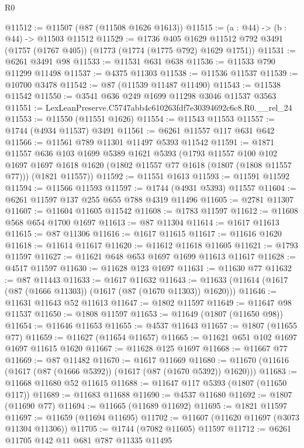 \begin{lexlean}{R0}
\begin{coremodule}
@11512 := @11507 (@87 (@11508 @1626 @1613))
@11515 := (a : @44) -> (b : @44) -> @11503 @11512
@11529 := @1736
    @405
    @1629
    @11512
    @792
    @3491
    (@1757 (@1767 @405))
    (@1773 (@1774 (@1775 @792) @1629 @1751))
@11531 := @6261 @3491 @98
@11533 := @11531 @631 @638
@11536 := @11533 @790 @11299 @11498
@11537 := @4375 @11303
@11538 := @11536 @11537
@11539 := @10700 @3478
@11542 := @87 (@11539 @11487 @11490)
@11543 := @11538 @11542
@11550 := @3541 @636 @249 @1699 @11298 @3046 @11537 @3563
@11551 := LexLeanPreserve.C5747abb4c610263fdf7e30394692c6c8.R0.__rel_24
@11553 := @11550 (@11551 @1626)
@11554 := @11543 @11553
@11557 := @1744 (@4934 @11537) @3491
@11561 := @6261 @11557 @117 @631 @642
@11566 := @11561 @789 @11301 @11497 @5393 @11542
@11591 := @1871
    @11557
    @636
    @103
    @1699
    @5389
    @1621
    @5393
    (@1793
      @11557
      @100
      @102
      @1697
      @1697
      @1618
      @1620
      (@1802 @11557 @77 @1618 (@1807 (@1808 @11557 @77)))
      (@1821 @11557))
@11592 := @11551 @1613
@11593 := @11591 @11592
@11594 := @11566 @11593
@11597 := @1744 (@4931 @5393) @11557
@11604 := @6261 @11597 @137 @255 @655 @788 @4319 @11496
@11605 := @2781 @11307
@11607 := @11604 @11605 @11542
@11608 := @1783 @11597
@11612 := @11608 @568 @654 @1700 @1697
@11613 := @87 @11304
@11614 := @1617 @11613
@11615 := @87 @11306
@11616 := @1617 @11615
@11617 := @11616 @1620
@11618 := @11614 @11617
@11620 := @11612 @11618 @11605
@11621 := @1793 @11597
@11627 := @11621 @648 @653 @1697 @1699 @11613 @11617
@11628 := @4517 @11597
@11630 := @11628 @123 @1697
@11631 := @11630 @77
@11632 := @87 @11443
@11633 := @1617 @11632
@11643 := @11633 (@11614 (@1617 (@87 (@1666 @11303)) (@1617 (@87 (@1670 @11303)) @1620)))
@11646 := @11631 @11643 @52 @11613
@11647 := @1802 @11597
@11649 := @11647 @98 @11537
@11650 := @1808 @11597
@11653 := @11649 (@1807 (@11650 @98))
@11654 := @11646 @11653
@11655 := @4537 @11643
@11657 := @1807 (@11655 @77)
@11659 := @11627 (@11654 @11657)
@11665 := @11621 @651 @102 @1697 @1697 @11615 @1620
@11667 := @11628 @125 @1697
@11668 := @11667 @77
@11669 := @87 @11482
@11670 := @1617 @11669
@11680 := @11670 (@11616 (@1617 (@87 (@1666 @5392)) (@1617 (@87 (@1670 @5392)) @1620)))
@11683 := @11668 @11680 @52 @11615
@11688 := @11647 @117 @5393 (@1807 (@11650 @117))
@11689 := @11683 @11688
@11690 := @4537 @11680
@11692 := @1807 (@11690 @77)
@11694 := @11665 (@11689 @11692)
@11695 := @1821 @11597
@11697 := @11659 (@11694 @11695)
@11702 := @11607 (@11620 @11697 (@3073 @11304 @11306))
@11705 := @1744 (@7082 @11605) @11597
@11712 := @6261 @11705 @142 @11 @681 @787 @11335 @11495

\end{coremodule}
\end{lexlean}
